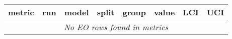 \begin{tabular}{llllllll}
\toprule
metric & run & model & split & group & value & LCI & UCI\\
\midrule
\multicolumn{8}{c}{\emph{No EO rows found in metrics}}\\
\bottomrule
\end{tabular}
